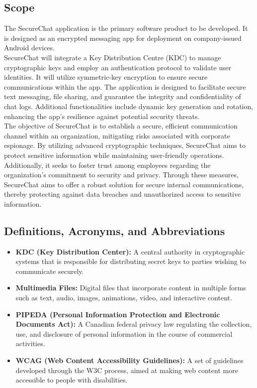\documentclass[]{article}
\begin{document}
\subsection{Scope}
\label{sub:scope}
The SecureChat application is the primary software product to be developed. It is designed as an encrypted messaging app for deployment on company-issued Android devices.\\
\newline
SecureChat will integrate a Key Distribution Centre (KDC) to manage cryptographic keys and employ an authentication protocol to validate user identities. It will utilize symmetric-key encryption to ensure secure communications within the app. The application is designed to facilitate secure text messaging, file sharing, and guarantee the integrity and confidentiality of chat logs. Additional functionalities include dynamic key generation and rotation, enhancing the app's resilience against potential security threats.\\
\newline
The objective of SecureChat is to establish a secure, efficient communication channel within an organization, mitigating risks associated with corporate espionage. By utilizing advanced cryptographic techniques, SecureChat aims to protect sensitive information while maintaining user-friendly operations. Additionally, it seeks to foster trust among employees regarding the organization's commitment to security and privacy. Through these measures, SecureChat aims to offer a robust solution for secure internal communications, thereby protecting against data breaches and unauthorized access to sensitive information.

\subsection{Definitions, Acronyms, and Abbreviations}
\label{sub:definitions_acronyms_and_abbreviations}
\begin{itemize}
	\item \textbf{KDC (Key Distribution Center):} A central authority in cryptographic systems that is responsible for distributing secret keys to parties wishing to communicate securely.
	\item \textbf{Multimedia Files:} Digital files that incorporate content in multiple forms such as text, audio, images, animations, video, and interactive content.
	\item \textbf{PIPEDA (Personal Information Protection and Electronic Documents Act):} A Canadian federal privacy law regulating the collection, use, and disclosure of personal information in the course of commercial activities.
	\item \textbf{WCAG (Web Content Accessibility Guidelines):} A set of guidelines developed through the W3C process, aimed at making web content more accessible to people with disabilities.
\end{itemize}
\end{document}
